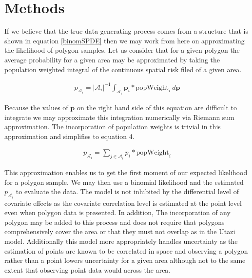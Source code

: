 \documentclass{article}
\begin{document}
\section{Methods}\label{methods}

If we believe that the true data generating process comes from a structure that is shown in equation \ref{binomSPDE} then we may work from here on approximating the likelihood of polygon samples. Let us consider that for a given polygon the average probability for a given area may be approximated by taking the population weighted integral of the continuous spatial risk filed of a given area. 

\begin{align}\label{pIntegral}
p_{\mathcal{A}_i} = |\mathcal{A}_i|^{-1}\int_{\mathcal{A}_i} \boldsymbol{p}_i * \text{popWeight}_i ~ d\boldsymbol{p}
\end{align}

Because the values of $\boldsymbol{p}$ on the right hand side of this equation are difficult to integrate we may approximate this integration numerically via Riemann sum approximation. The incorporation of population weights is trivial in this approximation and simplifies to equation 4.

\begin{align}\label{pRiemann}
p_{\mathcal{A}_i} = \sum_{j \in \mathcal{A}_i} p_i * \text{popWeight}_i
\end{align}

This approximation enables us to get the first moment of our expected likelihood for a polygon sample. We may then use a binomial likelihood and the estimated $p_{\mathcal{A}_i}$ to evaluate the data. The model is not inhibited by the differential level of covariate effects as the covariate correlation level is estimated at the point level even when polygon data is presented. In addition, The incorporation of any polygon may be added to this process and does not require that polygons comprehensively cover the area or that they must not overlap as in the Utazi model. Additionally this model more appropriately handles uncertainty as the estimation of points are known to be correlated in space and observing a polygon rather than a point lowers uncertainty for a given area although not to the same extent that observing point data would across the area.
\end{document}
